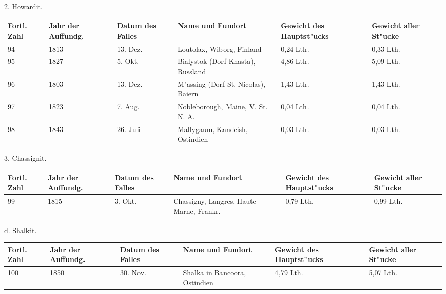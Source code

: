 \documentclass[a4paper, 11pt, oneside]{article}
\begin{document}
\clearpage
\begin{center}
2. Howardit.
\end{center}
\begin{center}
\begin{footnotesize}
\begin{tabular}{ |p{7mm}|p{7mm}|p{13mm}|p{48mm}|p{22mm}|p{22mm}| }
    \hline
    Fortl. Zahl & Jahr der Auffundg. & Datum des Falles & Name und Fundort & Gewicht des Hauptst"ucks & Gewicht aller St"ucke\\
    \hline\hline
    94 & 1813 & 13. Dez. & Loutolax, Wiborg, Finland & 0,24 Lth. & 0,33 Lth.\\\hline
    95 & 1827 & 5. Okt. & Bialystok (Dorf Knasta), Russland & 4,86 Lth. & 5,09 Lth.\\\hline
    96 & 1803 & 13. Dez. & M"assing (Dorf St. Nicolas), Baiern & 1,43 Lth. & 1,43 Lth.\\\hline
    97 & 1823 & 7. Aug. & Nobleborough, Maine, V. St. N. A. & 0,04 Lth. & 0,04 Lth.\\\hline
    98 & 1843 & 26. Juli & Mallygaum, Kandeish, Ostindien & 0,03 Lth. & 0,03 Lth.\\
    \hline
\end{tabular}
\end{footnotesize}
\end{center}
\begin{center}
3. Chassignit.
\end{center}
\begin{center}
\begin{footnotesize}
\begin{tabular}{ |p{7mm}|p{7mm}|p{13mm}|p{48mm}|p{22mm}|p{22mm}| }
    \hline
    Fortl. Zahl & Jahr der Auffundg. & Datum des Falles & Name und Fundort & Gewicht des Hauptst"ucks & Gewicht aller St"ucke\\
    \hline\hline
    99 & 1815 & 3. Okt. & Chassigny, Langres, Haute Marne, Frankr. & 0,79 Lth. & 0,99 Lth.\\
    \hline
\end{tabular}
\end{footnotesize}
\end{center}
\begin{center}
d. Shalkit.
\end{center}
\begin{center}
\begin{footnotesize}
\begin{tabular}{ |p{7mm}|p{7mm}|p{13mm}|p{48mm}|p{22mm}|p{22mm}| }
    \hline
    Fortl. Zahl & Jahr der Auffundg. & Datum des Falles & Name und Fundort & Gewicht des Hauptst"ucks & Gewicht aller St"ucke\\
    \hline\hline
    100 & 1850 & 30. Nov. & Shalka in Bancoora, Ostindien & 4,79 Lth. & 5,07 Lth.\\
    \hline
\end{tabular}
\end{footnotesize}
\end{center}
\end{document}
